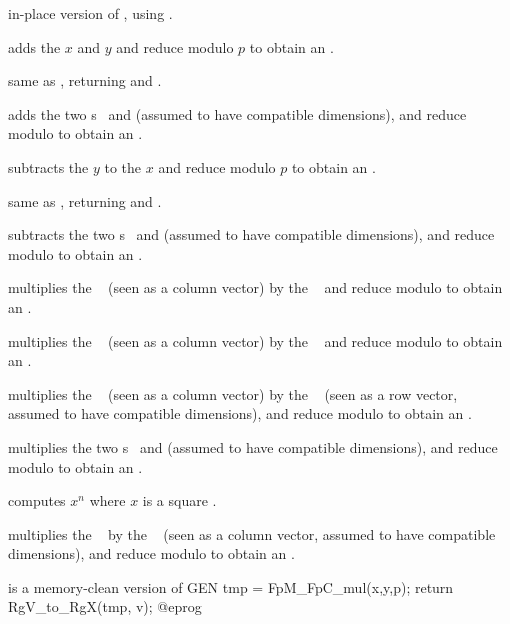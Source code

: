 in-place version of , using .

 adds the  $x$ and $y$
and reduce modulo $p$ to obtain an .

 same as , returning and
.

 adds the two s~
and  (assumed to have compatible dimensions), and reduce modulo
 to obtain an .

 subtracts the  $y$ to
the  $x$ and reduce modulo $p$ to obtain an .

 same as , returning and
.

 subtracts the two s~
and  (assumed to have compatible dimensions), and reduce modulo
 to obtain an .

 multiplies the ~
(seen as a column vector) by the ~ and reduce modulo  to
obtain an .

 multiplies the ~
(seen as a column vector) by the ~ and reduce modulo  to
obtain an .

 multiplies the ~
(seen as a column vector) by the ~ (seen as a row vector,
assumed to have compatible dimensions), and reduce modulo  to obtain
an .

 multiplies the two s~
and  (assumed to have compatible dimensions), and reduce modulo
 to obtain an .

 computes $x^n$ where $x$ is a
square .

 multiplies the ~
by the ~ (seen as a column vector, assumed to have compatible
dimensions), and reduce modulo  to obtain an .

 is a memory-clean
version of
\bprog
  GEN tmp = FpM_FpC_mul(x,y,p);
  return RgV_to_RgX(tmp, v);
@eprog


